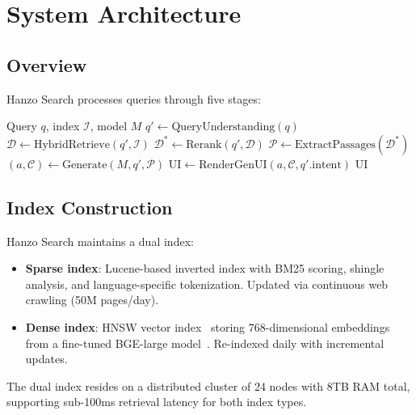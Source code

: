 \section{System Architecture}

\label{sec:architecture}

\subsection{Overview}

Hanzo Search processes queries through five stages:

\begin{algorithm}[H]
\caption{Hanzo Search Pipeline}
\label{alg:pipeline}
\begin{algorithmic}[1]
\Require Query $q$, index $\mathcal{I}$, model $M$
\State $q' \gets \text{QueryUnderstanding}(q)$ 
\State $\mathcal{D} \gets \text{HybridRetrieve}(q', \mathcal{I})$ 
\State $\mathcal{D}^* \gets \text{Rerank}(q', \mathcal{D})$ 
\State $\mathcal{P} \gets \text{ExtractPassages}(\mathcal{D}^*)$ 
\State $(a, \mathcal{C}) \gets \text{Generate}(M, q', \mathcal{P})$ 
\State $\text{UI} \gets \text{RenderGenUI}(a, \mathcal{C}, q'.\text{intent})$
\State \Return $\text{UI}$
\end{algorithmic}
\end{algorithm}

\subsection{Index Construction}

Hanzo Search maintains a dual index:

\begin{itemize}[leftmargin=1.1em]
    \item \textbf{Sparse index}: Lucene-based inverted index with BM25 scoring, shingle analysis, and language-specific tokenization. Updated via continuous web crawling (50M pages/day).
    \item \textbf{Dense index}: HNSW vector index~\cite{malkov2018efficient} storing 768-dimensional embeddings from a fine-tuned BGE-large model~\cite{xiao2023bge}. Re-indexed daily with incremental updates.
\end{itemize}

The dual index resides on a distributed cluster of 24 nodes with 8TB RAM total, supporting sub-100ms retrieval latency for both index types.

